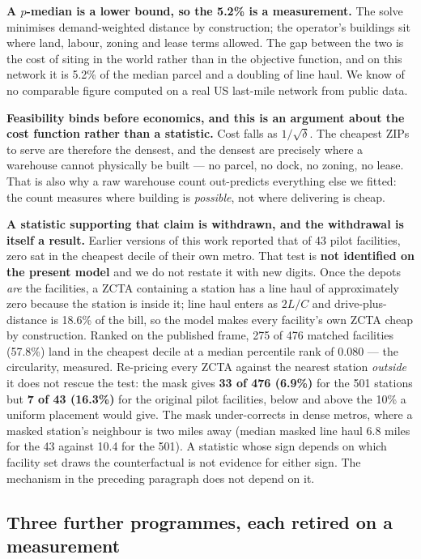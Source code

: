 \documentclass[conference]{IEEEtran}
\begin{document}
\textbf{A $p$-median is a lower bound, so the 5.2\% is a measurement.} The
solve minimises demand-weighted distance by construction; the operator's
buildings sit where land, labour, zoning and lease terms allowed. The gap
between the two is the cost of siting in the world rather than in the
objective function, and on this network it is 5.2\% of the median parcel and a
doubling of line haul. We know of no comparable figure computed on a real
US last-mile network from public data.

\textbf{Feasibility binds before economics, and this is an argument about the
cost function rather than a statistic.} Cost falls as $1/\sqrt{\delta}$. The
cheapest ZIPs to serve are therefore the densest, and the densest are
precisely where a warehouse cannot physically be built --- no parcel, no dock,
no zoning, no lease. That is also why a raw warehouse count out-predicts
everything else we fitted: the count measures where building is
\emph{possible}, not where delivering is cheap.

\textbf{A statistic supporting that claim is withdrawn, and the withdrawal is
itself a result.} Earlier versions of this work reported that of 43 pilot
facilities, zero sat in the cheapest decile of their own metro. That test is
\textbf{not identified on the present model} and we do not restate it with new
digits. Once the depots \emph{are} the facilities, a ZCTA containing a station
has a line haul of approximately zero because the station is inside it; line
haul enters as $2L/C$ and drive-plus-distance is 18.6\% of the bill, so the
model makes every facility's own ZCTA cheap by construction. Ranked on the
published frame, 275 of 476 matched facilities (57.8\%) land in the cheapest
decile at a median percentile rank of 0.080 --- the circularity, measured.
Re-pricing every ZCTA against the nearest station \emph{outside} it does not
rescue the test: the mask gives \textbf{33 of 476 (6.9\%)} for the 501
stations but \textbf{7 of 43 (16.3\%)} for the original pilot facilities,
below and above the 10\% a uniform placement would give. The mask
under-corrects in dense metros, where a masked station's neighbour is two
miles away (median masked line haul 6.8 miles for the 43 against 10.4 for the
501). A statistic whose sign depends on which facility set draws the
counterfactual is not evidence for either sign. The mechanism in the preceding
paragraph does not depend on it.

\subsection{Three further programmes, each retired on a measurement}
\end{document}
